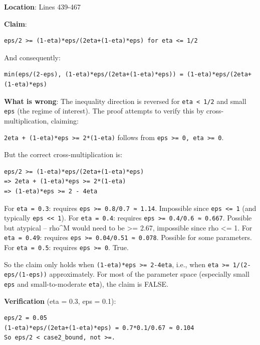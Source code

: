 \documentclass[
  12pt,
]{article}
\begin{document}
\textbf{Location}: Lines 439-467

\textbf{Claim}:

\begin{verbatim}
eps/2 >= (1-eta)*eps/(2eta+(1-eta)*eps) for eta <= 1/2
\end{verbatim}

And consequently:

\begin{verbatim}
min(eps/(2-eps), (1-eta)*eps/(2eta+(1-eta)*eps)) = (1-eta)*eps/(2eta+(1-eta)*eps)
\end{verbatim}

\textbf{What is wrong}: The inequality direction is reversed for
\texttt{eta\ \textless{}\ 1/2} and small \texttt{eps} (the regime of
interest). The proof attempts to verify this by cross-multiplication,
claiming:

\texttt{2eta\ +\ (1-eta)*eps\ \textgreater{}=\ 2*(1-eta)} follows from
\texttt{eps\ \textgreater{}=\ 0,\ eta\ \textgreater{}=\ 0}.

But the correct cross-multiplication is:

\begin{verbatim}
eps/2 >= (1-eta)*eps/(2eta+(1-eta)*eps)
=> 2eta + (1-eta)*eps >= 2*(1-eta)
=> (1-eta)*eps >= 2 - 4eta
\end{verbatim}

For \texttt{eta\ =\ 0.3}: requires
\texttt{eps\ \textgreater{}=\ 0.8/0.7\ ≈\ 1.14}. Impossible since
\texttt{eps\ \textless{}=\ 1} (and typically
\texttt{eps\ \textless{}\textless{}\ 1}). For \texttt{eta\ =\ 0.4}:
requires \texttt{eps\ \textgreater{}=\ 0.4/0.6\ ≈\ 0.667}. Possible but
atypical -- rho\^{}M would need to be \textgreater= 2.67, impossible
since rho \textless= 1. For \texttt{eta\ =\ 0.49}: requires
\texttt{eps\ \textgreater{}=\ 0.04/0.51\ ≈\ 0.078}. Possible for some
parameters. For \texttt{eta\ =\ 0.5}: requires
\texttt{eps\ \textgreater{}=\ 0}. True.

So the claim only holds when
\texttt{(1-eta)*eps\ \textgreater{}=\ 2-4eta}, i.e., when
\texttt{eta\ \textgreater{}=\ 1/(2-eps/(1-eps))} approximately. For most
of the parameter space (especially small \texttt{eps} and
small-to-moderate \texttt{eta}), the claim is FALSE.

\textbf{Verification} (eta = 0.3, eps = 0.1):

\begin{verbatim}
eps/2 = 0.05
(1-eta)*eps/(2eta+(1-eta)*eps) = 0.7*0.1/0.67 ≈ 0.104
So eps/2 < case2_bound, not >=.
\end{verbatim}
\end{document}
